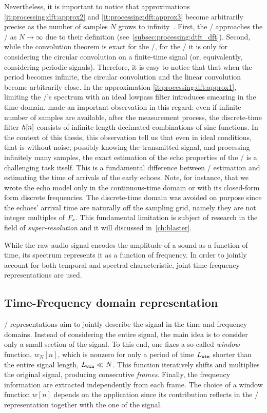 Nevertheless, it is important to notice that approximations \ref{it:processing:dft:approx2} and \ref{it:processing:dft:approx3} become arbitrarily precise as the number of samples $N$ grows to infinity~.
First, the \DFT/ approaches the \DTFT/ as $N\to\infty$ due to their definition (see~\cref{subsec:processing:dtft_dft}).
Second, while the convolution theorem is exact for the \DTFT/, for the \DFT/ it is only for  considering the circular convolution on a finite-time signal (or, equivalently, considering periodic signals).
Therefore, it is easy to notice that that when the period becomes infinite, the circular convolution and the linear convolution become arbitrarily close.
In the approximation \ref{it:processing:dft:approx1}, limiting the \RIR/'s spectrum with an ideal lowpass filter introduces smearing in the time-domain.
\citeauthor{tukuljac2018mulan} made an important observation in this regard:
even if infinite number of samples are available, after the measurement process, the discrete-time filter ${h}[n]$ consists of infinite-length decimated combinations of sinc functions.
In the context of this thesis, this observation tell us that even in ideal conditions, that is without noise, possibly knowing the transmitted signal, and processing infinitely many samples, the exact estimation of the echo properties of the \RIR/ is a challenging task itself.
This is a fundamental difference between \RIR/ estimation and estimating the time of arrivals of the early echoes.
Note, for instance, that we wrote the echo model only in the continuous-time domain or with its closed-form form discrete frequencies.
The discrete-time domain was avoided on purpose since the echoes' arrival time are naturally off the sampling grid, namely they are not integer multiples of $F_s$.
This fundamental limitation is subject of research in the field of \textit{super-resolution} and it will discussed in~\cref{ch:blaster}.

\mynewline
While the raw audio signal encodes the amplitude of a sound as a function of time, its spectrum represents it as a function of frequency.
In order to jointly account for both temporal and spectral characteristic, joint time-frequency representations are used.

\subsection{Time-Frequency domain representation}\label{subsec:processing:stft}
\TFdef/ representations aim to jointly describe the signal in the time and frequency domains.
Instead of considering the entire signal, the main idea is to consider only a small section of the signal.
To this end, one fixes a so-called \textit{window} function, $w_N[n]$, which is nonzero for only a period of time $L_\mathtt{win}$ shorter than the entire signal length, $L_\mathtt{win} \ll N$.
This function iteratively shifts and multiplies the original signal, producing consecutive \textit{frames}.
Finally, the frequency information are extracted independently from each frame.
The choice of a window function $w[n]$ depends on the application since its contribution reflects in the \TF/ representation together with the
one of the signal.

